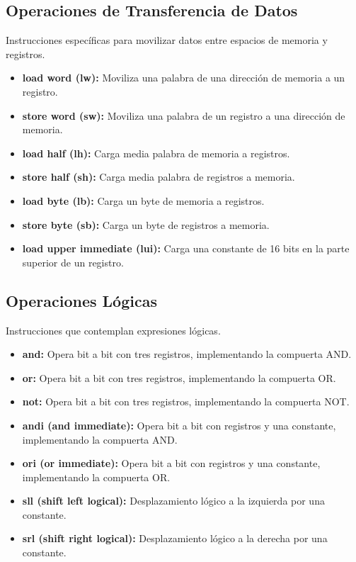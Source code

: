 \documentclass{article}
\begin{document}
\subsection*{Operaciones de Transferencia de Datos}
Instrucciones específicas para movilizar datos entre espacios de memoria y registros.
\begin{itemize}
    \item \textbf{load word (lw):} Moviliza una palabra de una dirección de memoria a un registro.
    \item \textbf{store word (sw):} Moviliza una palabra de un registro a una dirección de memoria.
    \item \textbf{load half (lh):} Carga media palabra de memoria a registros.
    \item \textbf{store half (sh):} Carga media palabra de registros a memoria.
    \item \textbf{load byte (lb):} Carga un byte de memoria a registros.
    \item \textbf{store byte (sb):} Carga un byte de registros a memoria.
   \item \textbf{load upper immediate (lui):} Carga una constante de 16 bits en la parte superior de un registro.
\end{itemize}

\subsection*{Operaciones Lógicas}
Instrucciones que contemplan expresiones lógicas.
\begin{itemize}
    \item \textbf{and:} Opera bit a bit con tres registros, implementando la compuerta AND.
    \item \textbf{or:} Opera bit a bit con tres registros, implementando la compuerta OR.
    \item \textbf{not:} Opera bit a bit con tres registros, implementando la compuerta NOT.
    \item \textbf{andi (and immediate):} Opera bit a bit con registros y una constante, implementando la compuerta AND.
    \item \textbf{ori (or immediate):} Opera bit a bit con registros y una constante, implementando la compuerta OR.
    \item \textbf{sll (shift left logical):} Desplazamiento lógico a la izquierda por una constante.
    \item \textbf{srl (shift right logical):} Desplazamiento lógico a la derecha por una constante.
\end{itemize}
\end{document}
